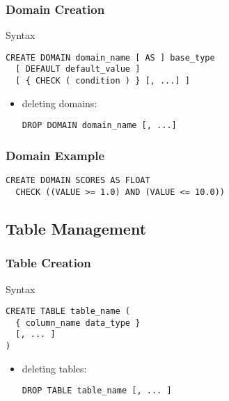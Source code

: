 \documentclass[dvipsnames]{beamer}
\theoremstyle{plain}
\begin{document}
\begin{frame}[fragile]
  \frametitle{Domain Creation}

  \begin{block}{Syntax}
    \begin{lstlisting}
CREATE DOMAIN domain_name [ AS ] base_type
  [ DEFAULT default_value ]
  [ { CHECK ( condition ) } [, ...] ]
    \end{lstlisting}
  \end{block}

  \medskip
  \begin{itemize}
    \item deleting domains:
    \begin{lstlisting}
DROP DOMAIN domain_name [, ...]
    \end{lstlisting}
  \end{itemize}
\end{frame}

\begin{frame}[fragile]
  \frametitle{Domain Example}

  \begin{example}
    \begin{lstlisting}
CREATE DOMAIN SCORES AS FLOAT
  CHECK ((VALUE >= 1.0) AND (VALUE <= 10.0))
    \end{lstlisting}
  \end{example}
\end{frame}

\subsection{Table Management}

\begin{frame}[fragile]
  \frametitle{Table Creation}

  \begin{block}{Syntax}
    \begin{lstlisting}
CREATE TABLE table_name (
  { column_name data_type }
  [, ... ]
)
    \end{lstlisting}
  \end{block}

  \medskip
  \begin{itemize}
    \item deleting tables:
    \begin{lstlisting}
DROP TABLE table_name [, ... ]
    \end{lstlisting}
  \end{itemize}
\end{frame}
\end{document}
